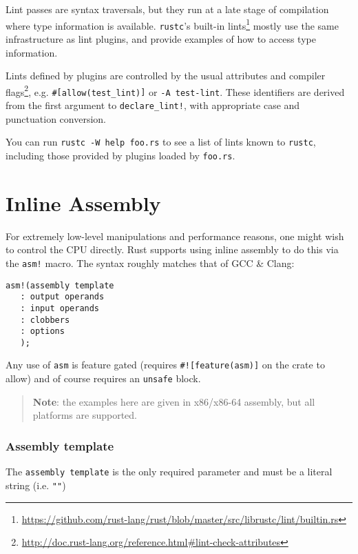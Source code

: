 \documentclass[a4paper,]{book}
\renewcommand{\href}[2]{#2\footnote{\url{#1}}}
\begin{document}
Lint passes are syntax traversals, but they run at a late stage of
compilation where type information is available. \texttt{rustc}'s
\href{https://github.com/rust-lang/rust/blob/master/src/librustc/lint/builtin.rs}{built-in
lints} mostly use the same infrastructure as lint plugins, and provide
examples of how to access type information.

Lints defined by plugins are controlled by the usual
\href{http://doc.rust-lang.org/reference.html\#lint-check-attributes}{attributes
and compiler flags}, e.g. \texttt{\#{[}allow(test\_lint){]}} or
\texttt{-A\ test-lint}. These identifiers are derived from the first
argument to \texttt{declare\_lint!}, with appropriate case and
punctuation conversion.

You can run \texttt{rustc\ -W\ help\ foo.rs} to see a list of lints
known to \texttt{rustc}, including those provided by plugins loaded by
\texttt{foo.rs}.

\section{Inline Assembly}\label{sec--inline-assembly}

For extremely low-level manipulations and performance reasons, one might
wish to control the CPU directly. Rust supports using inline assembly to
do this via the \texttt{asm!} macro. The syntax roughly matches that of
GCC \& Clang:

\begin{verbatim}
asm!(assembly template
   : output operands
   : input operands
   : clobbers
   : options
   );
\end{verbatim}

Any use of \texttt{asm} is feature gated (requires
\texttt{\#!{[}feature(asm){]}} on the crate to allow) and of course
requires an \texttt{unsafe} block.

\begin{quote}
\textbf{Note}: the examples here are given in x86/x86-64 assembly, but
all platforms are supported.
\end{quote}

\subsubsection{Assembly template}\label{assembly-template}

The \texttt{assembly\ template} is the only required parameter and must
be a literal string (i.e. \texttt{""})
\end{document}
